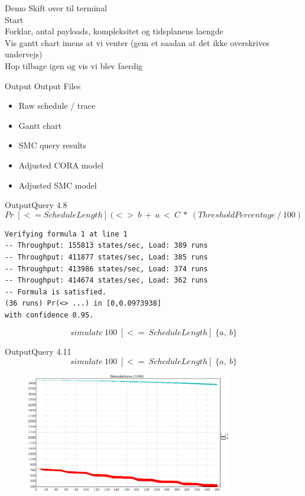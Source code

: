 \begin{frame}{Demo}{}
	Skift over til terminal\\
	Start\\
	Forklar, antal payloads, kompleksitet og tidsplanens laengde\\
	Vis gantt chart imens at vi venter (gem et saadan at det ikke overskrives undervejs)\\
	Hop tilbage igen og vis vi blev faerdig
\end{frame}

\begin{frame}{Output}{}
	Output Files
	\begin{itemize}
		\item Raw schedule / trace
		\item Gantt chart
		\item SMC query results
		\item Adjusted CORA model
		\item Adjusted SMC model
	\end{itemize}
\end{frame}

\begin{frame}[fragile]{Output}{Query 4.8}
	\begin{equation*}
		Pr\; [<=ScheduleLength] \; (<>\; b\ +\ a\ <\ C\ *\ (ThresholdPercentage\ /\ 100)
	\end{equation*}
	\begin{lstlisting}
Verifying formula 1 at line 1
-- Throughput: 155813 states/sec, Load: 389 runs
-- Throughput: 411877 states/sec, Load: 385 runs
-- Throughput: 413986 states/sec, Load: 374 runs
-- Throughput: 414674 states/sec, Load: 362 runs
-- Formula is satisfied.
(36 runs) Pr(<> ...) in [0,0.0973938]
with confidence 0.95.
	\end{lstlisting}
	\pause
	\begin{equation*}
		simulate\ 100 \; [<=\ ScheduleLength]\; \{ a,\ b\}
	\end{equation*}
\end{frame}

\begin{frame}{Output}{Query 4.11}
	\begin{equation*}
		simulate\ 100 \; [<=\ ScheduleLength]\; \{ a,\ b\}
	\end{equation*}
	\begin{figure}
		\includegraphics[width=0.80\textwidth]{graphics/ab.png}
		\end{figure}
\end{frame}

